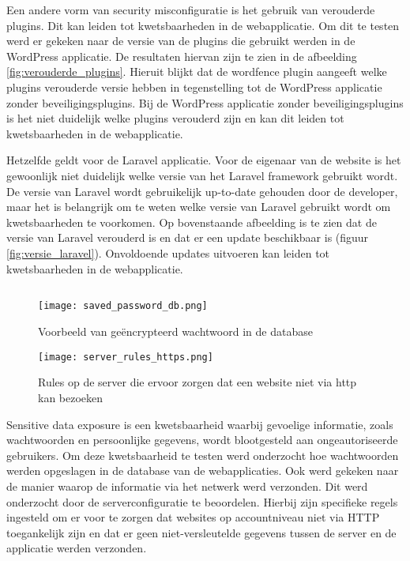 Een andere vorm van security misconfiguratie is het gebruik van verouderde plugins. Dit kan leiden tot kwetsbaarheden in 
de webapplicatie. Om dit te testen werd er gekeken naar de versie van de plugins die gebruikt werden in de WordPress 
applicatie. De resultaten hiervan zijn te zien in de afbeelding \ref{fig:verouderde_plugins}. Hieruit blijkt dat de wordfence 
plugin aangeeft welke plugins verouderde versie hebben in tegenstelling tot de WordPress applicatie zonder beveiligingsplugins. 
Bij de WordPress applicatie zonder beveiligingsplugins is het niet duidelijk welke plugins verouderd zijn en kan dit leiden 
tot kwetsbaarheden in de webapplicatie.

Hetzelfde geldt voor de Laravel applicatie. Voor de eigenaar van de website is het gewoonlijk niet duidelijk welke versie van 
het Laravel framework gebruikt wordt. De versie van Laravel wordt gebruikelijk up-to-date gehouden door de developer, maar het is 
belangrijk om te weten welke versie van Laravel gebruikt wordt om kwetsbaarheden te voorkomen. Op bovenstaande afbeelding is 
te zien dat de versie van Laravel verouderd is en dat er een update beschikbaar is (figuur \ref{fig:versie_laravel}). 
Onvoldoende updates uitvoeren kan leiden tot kwetsbaarheden in de webapplicatie. 


\subsection{}
\begin{figure}
    \centering
    \texttt{[image: saved\_password\_db.png]}
    \caption[Voorbeeld van geëncrypteerd wachtwoord in de database]{Voorbeeld van geëncrypteerd wachtwoord in de database}
    \label{fig:saved_password_db}
\end{figure}
\begin{figure}
    \centering
    \texttt{[image: server\_rules\_https.png]}
    \caption[Rules op de server die ervoor zorgen dat een website niet via http kan bezoeken]{Rules op de server die ervoor zorgen dat een website niet via http kan bezoeken}
    \label{fig:server_rules}
\end{figure}
Sensitive data exposure is een kwetsbaarheid waarbij gevoelige informatie, zoals wachtwoorden en persoonlijke gegevens, wordt 
blootgesteld aan ongeautoriseerde gebruikers. Om deze kwetsbaarheid te testen werd onderzocht hoe wachtwoorden werden 
opgeslagen in de database van de webapplicaties. Ook werd gekeken naar de manier waarop de informatie via het netwerk werd 
verzonden. Dit werd onderzocht door de serverconfiguratie te beoordelen. Hierbij zijn specifieke regels ingesteld om er voor 
te zorgen dat websites op accountniveau niet via HTTP toegankelijk zijn en dat er geen niet-versleutelde gegevens tussen de 
server en de applicatie werden verzonden.

